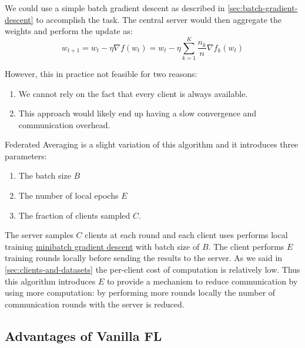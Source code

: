 We could use a simple batch gradient descent as described in \ref{sec:batch-gradient-descent} to accomplish the task.
The central server would then aggregate the weights and perform the update as:
\[
  w_{t+1} = w_t - \eta \nabla f(w_t) = w_t - \eta \sum_{k=1}^{K} \frac{n_k}{n} \nabla f_k(w_t)
\]

However, this in practice not feasible for two reasons:
\begin{enumerate}
  \item We cannot rely on the fact that every client is always available.
  \item This approach would likely end up having a slow convergence and communication overhead.
\end{enumerate}
Federated Averaging is a slight variation of this algorithm and it introduces three parameters:
\begin{enumerate}
  \item The batch size \(B\)
  \item The number of local epochs \(E\)
  \item The fraction of clients sampled \(C\).
\end{enumerate}
The server samples \(C\) clients at each round and each client uses performs local training
\hyperref[sec:minibatch-gradient-descent]{minibatch gradient descent} with batch size of $B$.
The client performs \(E\) training rounds locally before sending the results to the server.
As we said in \ref{sec:clients-and-datasets} the per-client cost of computation is relatively low.
Thus this algorithm introduces \(E\) to provide a mechanism to reduce communication by using more computation:
by performing more rounds locally the number of communication rounds with the server is reduced.

\subsection{Advantages of Vanilla FL}


